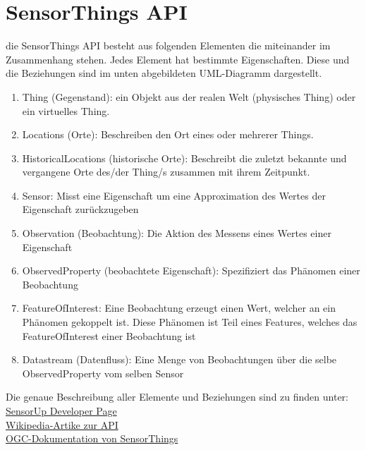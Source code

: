 \documentclass[12 pt]{article}
\begin{document}
	\section{SensorThings API}

	die SensorThings API besteht aus folgenden Elementen die miteinander im Zusammenhang stehen. Jedes Element hat bestimmte Eigenschaften. Diese und die Beziehungen sind im unten abgebildeten UML-Diagramm dargestellt. \\
	\begin{enumerate}
	
	\item Thing (Gegenstand): ein Objekt aus der realen Welt (physisches Thing) oder ein virtuelles Thing.
	\item Locations (Orte): Beschreiben den Ort eines oder mehrerer Things.
	\item HistoricalLocations (historische Orte): Beschreibt die zuletzt bekannte und vergangene Orte des/der Thing/s zusammen mit ihrem Zeitpunkt.
	\item Sensor: Misst eine Eigenschaft um eine Approximation des Wertes der Eigenschaft zurückzugeben
	\item Observation (Beobachtung): Die Aktion des Messens eines Wertes einer Eigenschaft
	\item ObservedProperty (beobachtete Eigenschaft): Spezifiziert das Phänomen einer Beobachtung
	\item FeatureOfInterest: Eine Beobachtung erzeugt einen Wert, welcher an ein Phänomen gekoppelt ist. Diese Phänomen ist Teil eines Features, welches das FeatureOfInterest einer Beobachtung ist
	\item Datastream (Datenfluss): Eine Menge von Beobachtungen über die selbe ObservedProperty vom selben Sensor   
	\end{enumerate}
	Die genaue Beschreibung aller Elemente und Beziehungen sind zu finden unter: \\
	\href{http://developers.sensorup.com/docs/}{SensorUp Developer Page}\\
	\href{https://en.wikipedia.org/wiki/SensorThings_API}{Wikipedia-Artike zur API}\\
	\href{http://docs.opengeospatial.org/is/15-078r6/15-078r6.html}{OGC-Dokumentation von SensorThings}\\


\end{document}
